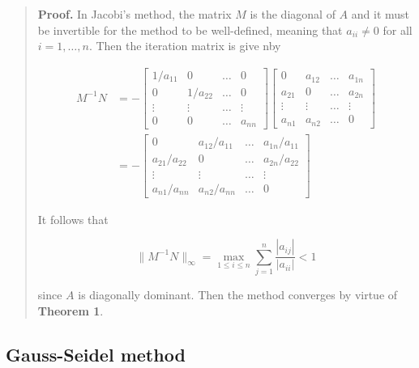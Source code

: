 \documentclass[12pt]{article}
\theoremstyle{definition}
\begin{document}
\small
\begin{quote}

\textbf{Proof.} In Jacobi's method, the matrix $M$ is the diagonal of $A$ and it
must be invertible for the method to be well-defined, meaning that 
$a_{ii} \neq 0$ for all $i = 1, \ldots, n$.  Then the iteration matrix is give
nby 

\begin{align*}
    M^{-1}N &= -\begin{bmatrix} 
        1 / a_{11} & 0 & \ldots & 0 \\ 
        0 & 1 / a_{22} & \ldots & 0 \\ 
        \vdots & \vdots & \ldots & \vdots \\ 
        0 & 0 & \ldots & a_{nn}
    \end{bmatrix} \begin{bmatrix} 
        0 & a_{12}  & \ldots & a_{1 n} \\ 
        a_{21} & 0 & \ldots & a_{2n} \\ 
        \vdots & \vdots & \ldots & \vdots \\ 
        a_{n1} & a_{n 2} & \ldots & 0
    \end{bmatrix}  \\ 
            &= -\begin{bmatrix} 
                0 & a_{12} / a_{11} & \ldots & a_{1 n} / a_{11} \\ 
                a_{21} / a_{22} & 0 & \ldots & a_{2n} / a_{22} \\ 
                \vdots & \vdots & \ldots & \vdots \\ 
                a_{n1} / a_{nn} & a_{n2} / a_{nn} & \ldots & 0
            \end{bmatrix} 
\end{align*}

It follows that 

\begin{equation*}
    \|M^{-1} N\|_{\infty} = \max_{1 \leq i \leq n} \sum_{j=1}^n 
    \frac{\left| a_{ij} \right| }{\left| a_{ii} \right| } < 1
\end{equation*}

since $A$ is diagonally dominant. Then the method converges by virtue of 
\textbf{Theorem 1}.

\end{quote}
\normalsize




\subsection{Gauss-Seidel method}
\end{document}
